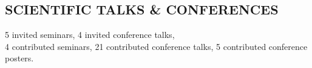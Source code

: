 \documentclass[letter, margin, 10pt]{res} %
\begin{document}
\begin{resume}

\parskip \baselineskip
\vspace{-6pt}
\section{SCIENTIFIC TALKS \& CONFERENCES}
5 invited seminars, 4 invited conference talks,\\
4 contributed seminars, 21 contributed conference talks, 5 contributed conference posters.


\end{resume}
\end{document}
